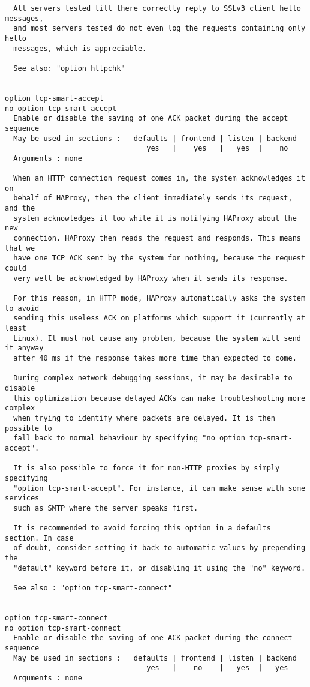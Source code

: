 \begin{verbatim}
  All servers tested till there correctly reply to SSLv3 client hello messages,
  and most servers tested do not even log the requests containing only hello
  messages, which is appreciable.

  See also: "option httpchk"


option tcp-smart-accept
no option tcp-smart-accept
  Enable or disable the saving of one ACK packet during the accept sequence
  May be used in sections :   defaults | frontend | listen | backend
                                 yes   |    yes   |   yes  |    no
  Arguments : none

  When an HTTP connection request comes in, the system acknowledges it on
  behalf of HAProxy, then the client immediately sends its request, and the
  system acknowledges it too while it is notifying HAProxy about the new
  connection. HAProxy then reads the request and responds. This means that we
  have one TCP ACK sent by the system for nothing, because the request could
  very well be acknowledged by HAProxy when it sends its response.

  For this reason, in HTTP mode, HAProxy automatically asks the system to avoid
  sending this useless ACK on platforms which support it (currently at least
  Linux). It must not cause any problem, because the system will send it anyway
  after 40 ms if the response takes more time than expected to come.

  During complex network debugging sessions, it may be desirable to disable
  this optimization because delayed ACKs can make troubleshooting more complex
  when trying to identify where packets are delayed. It is then possible to
  fall back to normal behaviour by specifying "no option tcp-smart-accept".

  It is also possible to force it for non-HTTP proxies by simply specifying
  "option tcp-smart-accept". For instance, it can make sense with some services
  such as SMTP where the server speaks first.

  It is recommended to avoid forcing this option in a defaults section. In case
  of doubt, consider setting it back to automatic values by prepending the
  "default" keyword before it, or disabling it using the "no" keyword.

  See also : "option tcp-smart-connect"


option tcp-smart-connect
no option tcp-smart-connect
  Enable or disable the saving of one ACK packet during the connect sequence
  May be used in sections :   defaults | frontend | listen | backend
                                 yes   |    no    |   yes  |   yes
  Arguments : none


\end{verbatim}
